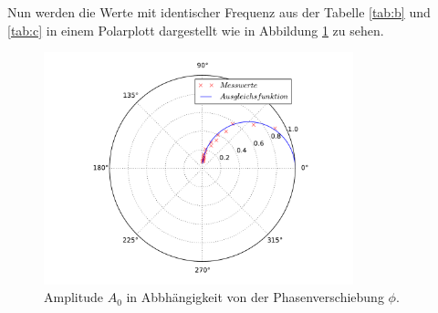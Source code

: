 \newpage
Nun werden die Werte mit identischer Frequenz
aus der Tabelle \ref{tab:b} und \ref{tab:c} in einem
Polarplott dargestellt wie in Abbildung \ref{abb:d} zu sehen.
\begin{figure}
\centering
\includegraphics[width=0.8\textwidth]{d.pdf}
\caption{Amplitude $A_0$ in Abbhängigkeit von der Phasenverschiebung $\phi$. }
\label{abb:d}
\end{figure}
\FloatBarrier
